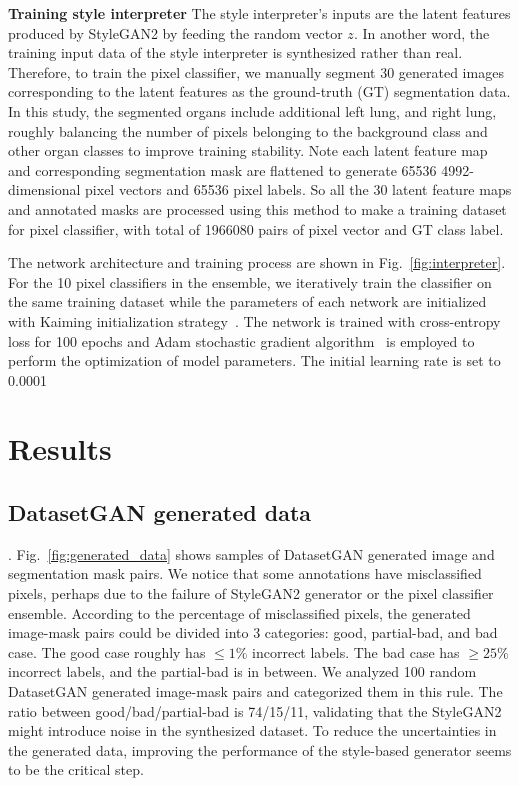 \documentclass[conference]{IEEEtran}
\begin{document}
\noindent \textbf{Training style interpreter}
The style interpreter's inputs are the latent features produced by StyleGAN2 by feeding the random vector $z$. In another word, the training input data of the style interpreter is synthesized rather than real. Therefore, to train the pixel classifier, we manually segment 30 generated images corresponding to the latent features as the ground-truth (GT) segmentation data. 
In this study, the segmented organs include additional left lung, and right lung, roughly balancing the number of pixels belonging to the background class and other organ classes to improve training stability. 
Note each latent feature map and corresponding segmentation mask are flattened to generate 65536 4992-dimensional pixel vectors and 65536 pixel labels. So all the 30 latent feature maps and annotated masks are processed using this method to make a training dataset for pixel classifier, with total of 1966080 pairs of pixel vector and GT class label. 

The network architecture and training process are shown in Fig.~\ref{fig:interpreter}. For the 10 pixel classifiers in the ensemble, we iteratively train the classifier on the same training dataset while the parameters of each network are initialized with Kaiming initialization strategy~\cite{He2015DelvingDI}. The network is trained with cross-entropy loss for 100 epochs and Adam stochastic gradient algorithm~\cite{Kingma2015AdamAM} is employed to perform the optimization of model parameters. The initial learning rate is set to 0.0001

\vspace{-0.2cm}
\section{Results}
\subsection{DatasetGAN generated data}.
\label{sec:generated_data}
Fig.~\ref{fig:generated_data} shows samples of DatasetGAN generated image and segmentation mask pairs. We notice that some annotations have misclassified pixels, perhaps due to the failure of StyleGAN2 generator or the pixel classifier ensemble. 
According to the percentage of misclassified pixels, the generated image-mask pairs could be divided into 3 categories: good, partial-bad, and bad case. The good case roughly has $\le 1\%$ incorrect labels. 
The bad case has $\ge 25\%$ incorrect labels, and the partial-bad is in between. 
We analyzed 100 random DatasetGAN generated image-mask pairs and categorized them in this rule. The ratio between good/bad/partial-bad is 74/15/11, validating that the StyleGAN2 might introduce noise in the synthesized dataset. 
To reduce the uncertainties in the generated data, improving the performance of the style-based generator seems to be the critical step. 
\end{document}
